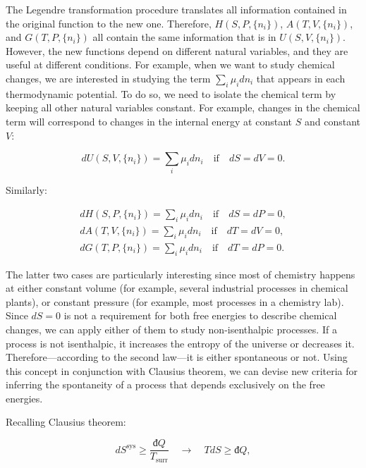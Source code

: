 \documentclass[
  9pt,
]{extbook}
\theoremstyle{definition}
\theoremstyle{definition}
\theoremstyle{definition}
\theoremstyle{remark}
\begin{document}
The Legendre transformation procedure translates all information contained in the original function to the new one. Therefore, \(H(S,P,\{n_i\})\), \(A(T,V,\{n_i\})\), and \(G(T,P,\{n_i\})\) all contain the same information that is in \(U(S,V,\{n_i\})\). However, the new functions depend on different natural variables, and they are useful at different conditions. For example, when we want to study chemical changes, we are interested in studying the term \(\sum_i\mu_i dn_i\) that appears in each thermodynamic potential. To do so, we need to isolate the chemical term by keeping all other natural variables constant. For example, changes in the chemical term will correspond to changes in the internal energy at constant \(S\) and constant \(V\):

\begin{equation}
dU(S,V,\{n_i\}) = \sum_i\mu_i dn_i \quad \text{if} \quad dS=dV=0.
\label{eq:duchem}
\end{equation}

Similarly:

\begin{equation}
\begin{aligned}
dH(S,P,\{n_i\}) = \sum_i\mu_i dn_i \quad \text{if} \quad dS=dP=0, \\
dA(T,V,\{n_i\}) = \sum_i\mu_i dn_i \quad \text{if} \quad dT=dV=0, \\
dG(T,P,\{n_i\}) = \sum_i\mu_i dn_i \quad \text{if} \quad dT=dP=0.
\end{aligned}
\label{eq:dhagchem}
\end{equation}

The latter two cases are particularly interesting since most of chemistry happens at either constant volume (for example, several industrial processes in chemical plants), or constant pressure (for example, most processes in a chemistry lab). Since \(dS=0\) is not a requirement for both free energies to describe chemical changes, we can apply either of them to study non-isenthalpic processes. If a process is not isenthalpic, it increases the entropy of the universe or decreases it. Therefore---according to the second law---it is either spontaneous or not. Using this concept in conjunction with Clausius theorem, we can devise new criteria for inferring the spontaneity of a process that depends exclusively on the free energies.

Recalling Clausius theorem:

\begin{equation}
d S^{\mathrm{sys}} \geq \frac{đQ}{T_{\text{surr}}} \quad \longrightarrow \quad TdS \geq đQ,
\label{eq:dssyscrit}
\end{equation}
\end{document}
